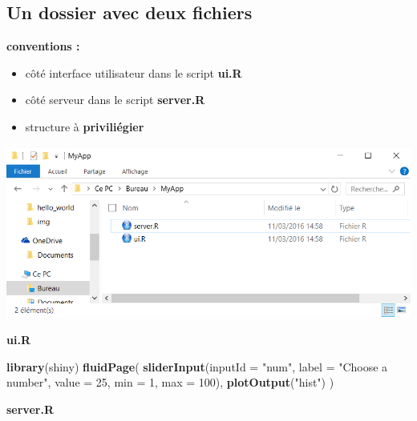 \documentclass[]{article}
\newenvironment{Shaded}{\begin{snugshade}}{\end{snugshade}}
\newcommand{\KeywordTok}[1]{\textcolor[rgb]{0.13,0.29,0.53}{\textbf{#1}}}
\newcommand{\DataTypeTok}[1]{\textcolor[rgb]{0.13,0.29,0.53}{#1}}
\newcommand{\DecValTok}[1]{\textcolor[rgb]{0.00,0.00,0.81}{#1}}
\newcommand{\StringTok}[1]{\textcolor[rgb]{0.31,0.60,0.02}{#1}}
\newcommand{\ControlFlowTok}[1]{\textcolor[rgb]{0.13,0.29,0.53}{\textbf{#1}}}
\newcommand{\OperatorTok}[1]{\textcolor[rgb]{0.81,0.36,0.00}{\textbf{#1}}}
\newcommand{\NormalTok}[1]{#1}
\providecommand{\tightlist}{%
  \setlength{\itemsep}{0pt}\setlength{\parskip}{0pt}}
\begin{document}
\subsection{Un dossier avec deux
fichiers}\label{un-dossier-avec-deux-fichiers}

\textbf{conventions :}

\begin{itemize}
\tightlist
\item
  côté interface utilisateur dans le script \textbf{ui.R}
\item
  côté serveur dans le script \textbf{server.R}
\item
  structure à \textbf{priviliégier}
\end{itemize}

\includegraphics{img/dual_apps.png}

\textbf{ui.R}

\begin{Shaded}
\begin{Highlighting}[]
\KeywordTok{library}\NormalTok{(shiny)}
\KeywordTok{fluidPage}\NormalTok{(}
  \KeywordTok{sliderInput}\NormalTok{(}\DataTypeTok{inputId =} \StringTok{"num"}\NormalTok{, }\DataTypeTok{label =} \StringTok{"Choose a number"}\NormalTok{, }
              \DataTypeTok{value =} \DecValTok{25}\NormalTok{, }\DataTypeTok{min =} \DecValTok{1}\NormalTok{, }\DataTypeTok{max =} \DecValTok{100}\NormalTok{),  }
  \KeywordTok{plotOutput}\NormalTok{(}\StringTok{"hist"}\NormalTok{)}
\NormalTok{)}
\end{Highlighting}
\end{Shaded}

\textbf{server.R}

\begin{Shaded}
\end{Shaded}
\end{document}

